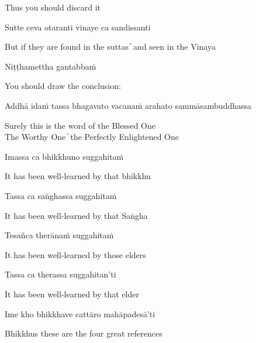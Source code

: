 \begin{cprenglish}
Thus you should discard it
\end{cprenglish}

Sutte ceva otaranti vinaye ca sandissanti

\begin{cprenglish}
But if they are found in the suttas  ̓  and seen in the Vinaya
\end{cprenglish}

Niṭṭhamettha gantabbaṁ

\begin{cprenglish}
You should draw the conclusion:
\end{cprenglish}

Addhā idaṁ tassa bhagavato vacanaṁ arahato sammāsambuddhassa

\begin{cprenglish}
Surely this is the word of the Blessed One\\
The Worthy One  ̓  the Perfectly Enlightened One
\end{cprenglish}

Imassa ca bhikkhuno suggahitaṁ

\begin{cprenglish}
It has been well-learned by that bhikkhu
\end{cprenglish}

Tassa ca saṅghassa suggahitaṁ

\begin{cprenglish}
It has been well-learned by that Saṅgha
\end{cprenglish}

Tesañca therānaṁ suggahitaṁ

\begin{cprenglish}
It has been well-learned by those elders
\end{cprenglish}

Tassa ca therassa suggahitan’ti

\begin{cprenglish}
It has been well-learned by that elder
\end{cprenglish}

Ime kho bhikkhave cattāro mahāpadesā’ti

\begin{cprenglish}
Bhikkhus these are the four great references
\end{cprenglish}


\clearpage

